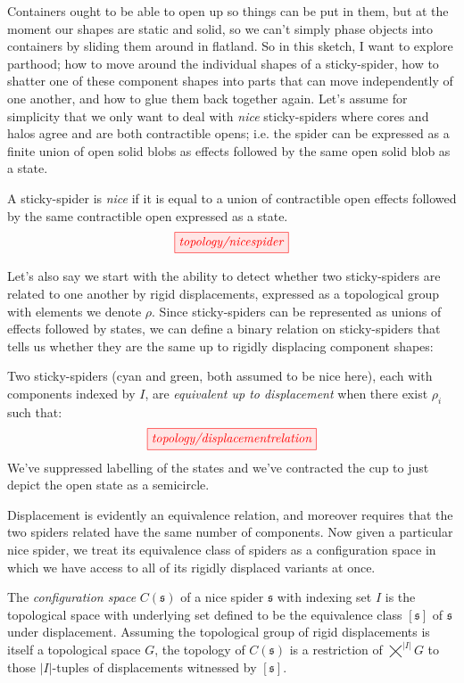Containers ought to be able to open up so things can be put in them, but at the moment our shapes are static and solid, so we can't simply phase objects into containers by sliding them around in flatland. So in this sketch, I want to explore parthood; how to move around the individual shapes of a sticky-spider, how to shatter one of these component shapes into parts that can move independently of one another, and how to glue them back together again. Let's assume for simplicity that we only want to deal with \emph{nice} sticky-spiders where cores and halos agree and are both contractible opens; i.e. the spider can be expressed as a finite union of open solid blobs as effects followed by the same open solid blob as a state.

\begin{defn}
A sticky-spider is \emph{nice} if it is equal to a union of contractible open effects followed by the same contractible open expressed as a state.
\[\tikzfig{topology/nicespider}\]
\end{defn}

Let's also say we start with the ability to detect whether two sticky-spiders are related to one another by rigid displacements, expressed as a topological group with elements we denote $\rho$. Since sticky-spiders can be represented as unions of effects followed by states, we can define a binary relation on sticky-spiders that tells us whether they are the same up to rigidly displacing component shapes:

\begin{defn}
Two sticky-spiders (cyan and green, both assumed to be nice here), each with components indexed by $I$, are \emph{equivalent up to displacement} when there exist $\rho_i$ such that:
\[\tikzfig{topology/displacementrelation}\]
We've suppressed labelling of the states and we've contracted the cup to just depict the open state as a semicircle.
\end{defn}

Displacement is evidently an equivalence relation, and moreover requires that the two spiders related have the same number of components. Now given a particular nice spider, we treat its equivalence class of spiders as a configuration space in which we have access to all of its rigidly displaced variants at once.

\begin{defn}\label{defn:configurationspace}
The \emph{configuration space} $C(\mathfrak{s})$ of a nice spider $\mathfrak{s}$ with indexing set $I$ is the topological space with underlying set defined to be the equivalence class $[\mathfrak{s}]$ of $\mathfrak{s}$ under displacement. Assuming the topological group of rigid displacements is itself a topological space $G$, the topology of $C(\mathfrak{s})$ is a restriction of $\bigtimes^{|I|} G$ to those $|I|$-tuples of displacements witnessed by $[\mathfrak{s}]$.
\end{defn}

